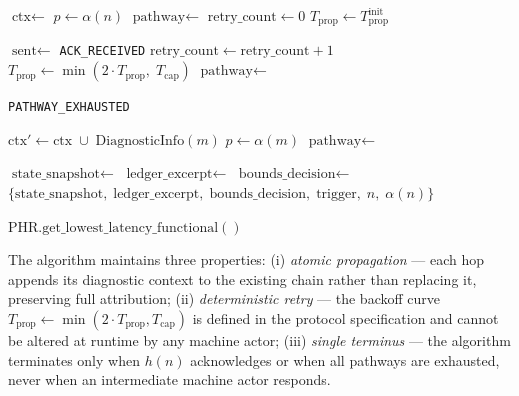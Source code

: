 \begin{algorithm}[htbp]
\caption{Bailout Protocol escalation algorithm.}
\label{alg:escalate}
\begin{algorithmic}[1]
  \State $\text{ctx} \leftarrow$ 
  \State {}
  \State $p \leftarrow \alpha(n)$
  \State $\text{pathway} \leftarrow$ 
  \State $\text{retry\_count} \leftarrow 0$
  \State $T_{\text{prop}} \leftarrow T_{\text{prop}}^{\text{init}}$

    \State $\text{sent} \leftarrow$ 
      \State \Return \texttt{ACK\_RECEIVED}
    \EndIf
    \State $\text{retry\_count} \leftarrow \text{retry\_count} + 1$
    \State $T_{\text{prop}} \leftarrow \min(2 \cdot T_{\text{prop}},\; T_{\text{cap}})$
    \State $\text{pathway} \leftarrow$ 
  \EndWhile

  \State {}
  \State \Return \texttt{PATHWAY\_EXHAUSTED}
\EndProcedure

\Statex
{}
  \State $\text{ctx}' \leftarrow \text{ctx} \;\cup\; \text{DiagnosticInfo}(m)$
  \State $p \leftarrow \alpha(m)$
  \State $\text{pathway} \leftarrow$ 
  \State {}
  \State \Return
\EndProcedure

\Statex
{}
  \State $\text{state\_snapshot} \leftarrow$ 
  \State $\text{ledger\_excerpt} \leftarrow$ 
  \State $\text{bounds\_decision} \leftarrow$ 
  \State \Return $\{\text{state\_snapshot},\; \text{ledger\_excerpt},\; \text{bounds\_decision},\; \text{trigger},\; n,\; \alpha(n)\}$
\EndProcedure

\Statex
{}
  \State \Return $\text{PHR}.\text{get\_lowest\_latency\_functional}()$
\EndFunction
\end{algorithmic}
\end{algorithm}

The algorithm maintains three properties: (i) \emph{atomic propagation} — each hop appends its diagnostic context to the existing chain rather than replacing it, preserving full attribution; (ii) \emph{deterministic retry} — the backoff curve $T_{\text{prop}} \leftarrow \min(2 \cdot T_{\text{prop}}, T_{\text{cap}})$ is defined in the protocol specification and cannot be altered at runtime by any machine actor; (iii) \emph{single terminus} — the algorithm terminates only when $h(n)$ acknowledges or when all pathways are exhausted, never when an intermediate machine actor responds.

